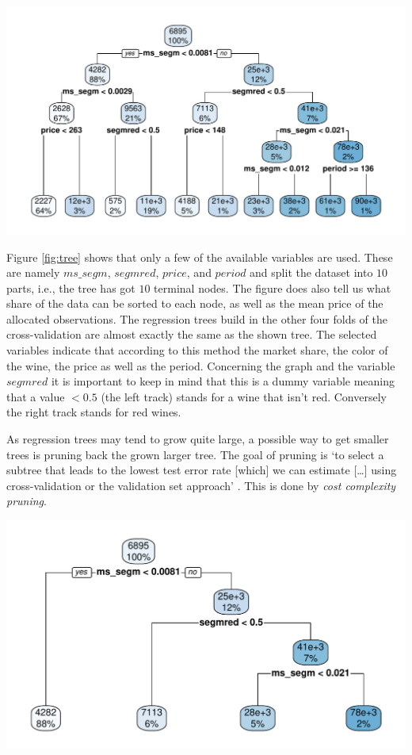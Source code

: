 \documentclass[11pt,]{article}
\let\origfigure\figure
\let\endorigfigure\endfigure
\renewenvironment{figure}[1][2] {
    \expandafter\origfigure\expandafter[H]
} {
    \endorigfigure
}
\begin{document}
\begin{figure}
\centering
\includegraphics{../00_data/output_paper/09_tree.pdf}
\caption{\label{fig:tree}Example of a Regression Tree.}
\end{figure}

Figure \ref{fig:tree} shows that only a few of the available variables
are used. These are namely \(ms\_segm\), \(segmred\), \(price\), and
\(period\) and split the dataset into \(10\) parts, i.e., the tree has
got \(10\) terminal nodes. The figure does also tell us what share of
the data can be sorted to each node, as well as the mean price of the
allocated observations. The regression trees build in the other four
folds of the cross-validation are almost exactly the same as the shown
tree. The selected variables indicate that according to this method the
market share, the color of the wine, the price as well as the period.
Concerning the graph and the variable \(segmred\) it is important to
keep in mind that this is a dummy variable meaning that a value
\(< 0.5\) (the left track) stands for a wine that isn't red. Conversely
the right track stands for red wines.

As regression trees may tend to grow quite large, a possible way to get
smaller trees is pruning back the grown larger tree. The goal of pruning
is `to select a subtree that leads to the lowest test error rate
{[}which{]} we can estimate {[}\ldots{}{]} using cross-validation or the
validation set approach' \autocite[][p. 308]{James2014}. This is done by
\emph{cost complexity pruning}.

\begin{figure}
\centering
\includegraphics{../00_data/output_paper/09_tree_pruned.pdf}
\caption{\label{fig:tree_pruned}Example of a Pruned Tree.}
\end{figure}
\end{document}
